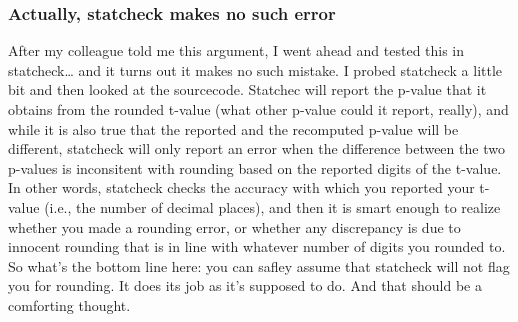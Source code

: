 \documentclass[]{article}
\begin{document}
\subsubsection{Actually, statcheck makes no such
error}\label{actually-statcheck-makes-no-such-error}

After my colleague told me this argument, I went ahead and tested this
in statcheck\ldots{} and it turns out it makes no such mistake. I probed
statcheck a little bit and then looked at the sourcecode. Statchec will
report the p-value that it obtains from the rounded t-value (what other
p-value could it report, really), and while it is also true that the
reported and the recomputed p-value will be different, statcheck will
only report an error when the difference between the two p-values is
inconsitent with rounding based on the reported digits of the t-value.
In other words, statcheck checks the accuracy with which you reported
your t-value (i.e., the number of decimal places), and then it is smart
enough to realize whether you made a rounding error, or whether any
discrepancy is due to innocent rounding that is in line with whatever
number of digits you rounded to. So what's the bottom line here: you can
safley assume that statcheck will not flag you for rounding. It does its
job as it's supposed to do. And that should be a comforting thought.
\end{document}
